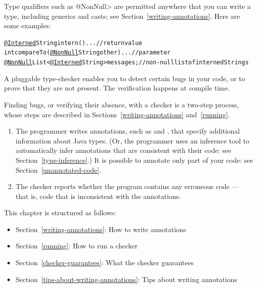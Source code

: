 Type qualifiers such as \<@NonNull> are permitted anywhere
that you can write a type, including generics and casts; see
Section~\ref{writing-annotations}.  Here are some examples:

\begin{alltt}
  \underline{@Interned} String intern() \ttlcb{} ... \ttrcb{}             // return value
  int compareTo(\underline{@NonNull} String other) \ttlcb{} ... \ttrcb{}  // parameter
  \underline{@NonNull} List<\underline{@Interned} String> messages;     // non-null list of interned Strings
\end{alltt}


\htmlhr
{}

A pluggable type-checker enables you to detect certain bugs in your code,
or to prove that they are not present.  The verification happens at compile
time.


Finding bugs, or verifying their absence, with a checker is a two-step process, whose steps are
described in Sections~\ref{writing-annotations} and~\ref{running}.

\begin{enumerate}

\item The programmer writes annotations, such as  and
  , that specify additional information about Java types.
  (Or, the programmer uses an inference tool to automatically infer
  annotations that are consistent with their code:  see Section~\ref{type-inference}.)
  It is possible to annotate only part of your code:  see
  Section~\ref{unannotated-code}.

\item The checker reports whether the program contains any erroneous code
  --- that is, code that is inconsistent with the annotations.

\end{enumerate}

This chapter is structured as follows:
\begin{itemize}
\item Section~\ref{writing-annotations}: How to write annotations
\item Section~\ref{running}:  How to run a checker
\item Section~\ref{checker-guarantees}: What the checker guarantees
\item Section~\ref{tips-about-writing-annotations}: Tips about writing annotations
\end{itemize}


